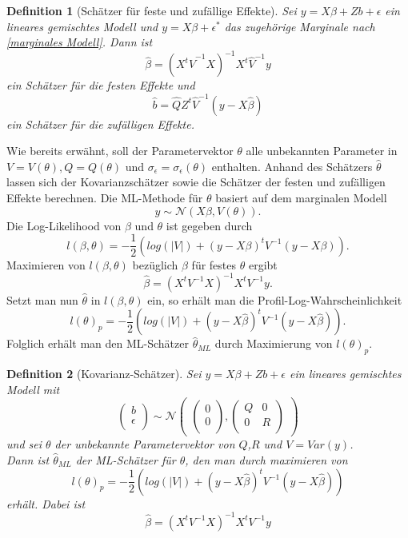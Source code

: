 \documentclass[%
thesis=student,%
coverpage=false,%
titlepage=false,%
headmarks=true, %
german,%
font=libertine, %
math=newpxtx, %
BCOR=5mm,%
coverBCOR=11mm%
]{tumbook}
\theoremstyle{break}
\newtheorem{definition}{Definition}[section]
\begin{document}
\begin{definition}[Schätzer für feste und zufällige Effekte]
	Sei $y = X\beta + Zb + \epsilon$ ein lineares gemischtes Modell und $y=X\beta + \epsilon^*$ das zugehörige Marginale nach \ref{marginales Modell}.
	Dann ist $$\hat{\beta} = (X^t \hat{V}^{-1}X)^{-1}X^t \hat{V}^{-1}y$$ ein Schätzer für die festen Effekte und $$ \hat{b} = \hat{Q} Z^t\hat{V}^{-1}(y-X\hat{\beta})$$ ein Schätzer für die zufälligen Effekte.
\end{definition}\noindent
Wie bereits erwähnt, soll der Parametervektor $\theta$ alle unbekannten Parameter in $V= V(\theta), Q = Q(\theta)$ und $\sigma_\epsilon = \sigma_\epsilon(\theta)$ enthalten. Anhand des Schätzers $\hat{\theta}$  lassen sich der Kovarianzschätzer sowie die Schätzer der festen und zufälligen Effekte berechnen. 
Die ML-Methode für $\theta$ basiert auf dem marginalen Modell 
$$y \sim \mathcal{N}(X\beta,V(\theta)).$$
Die Log-Likelihood von $\beta$ und $\theta$ ist gegeben durch
$$l(\beta,\theta) = - \frac{1}{2} (log(|V|)+(y-X\beta)^tV^{-1}(y-X\beta)).$$
Maximieren von $l(\beta,\theta)$ bezüglich $\beta$ für festes $\theta$ ergibt 
$$ \hat{\beta} = (X^tV^{-1}X)^{-1}X^tV^{-1}y.$$
Setzt man nun $\hat{\theta}$ in $l(\beta,\theta)$ ein, so erhält man die Profil-Log-Wahrscheinlichkeit 
$$ l(\theta)_p = - \frac{1}{2} (log(|V|)+(y-X\hat{\beta})^tV^{-1}(y-X\hat{\beta})).$$
Folglich erhält man den ML-Schätzer $\hat{\theta}_{ML}$ durch Maximierung von $l(\theta)_p$. 
\begin{definition}[Kovarianz-Schätzer]
	Sei $y = X\beta + Zb + \epsilon $ ein lineares gemischtes Modell mit $$\begin{pmatrix}
		b \\
		\epsilon \\
	\end{pmatrix}
	\sim
	\mathcal{N}
	\begin{pmatrix}
		\begin{pmatrix}
			
			0 \\
			0 \\
		\end{pmatrix},
		\begin{pmatrix}
			Q & 0 \\
			0 & R \\
		\end{pmatrix}
	\end{pmatrix}$$ und sei $\theta$ der unbekannte Parametervektor von $Q$,$R$ und $V=Var(y)$. \\
	Dann ist $\hat{\theta}_{ML}$ der ML-Schätzer für $\theta$, den man durch maximieren von $$  l(\theta)_p = - \frac{1}{2} (log(|V|)+(y-X\hat{\beta})^tV^{-1}(y-X\hat{\beta})) $$erhält.
	Dabei ist $$ \hat{\beta} = (X^tV^{-1}X)^{-1}X^tV^{-1}y$$
\end{definition} \noindent
\end{document}
